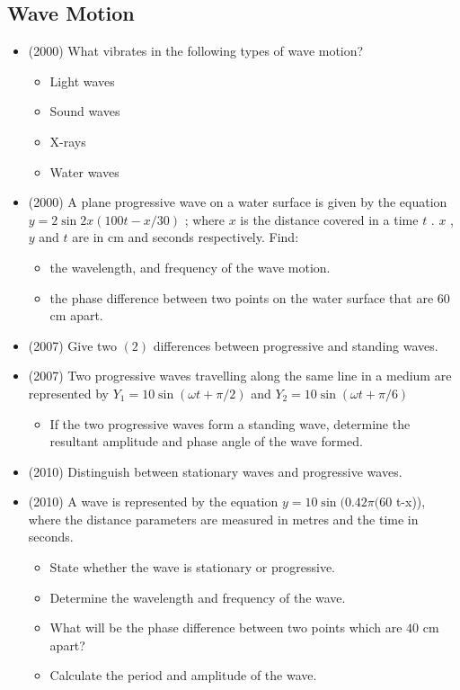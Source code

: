 \documentclass{article}
\begin{document}
\subsection{Wave Motion}
\begin{itemize}
\item (2000)  What vibrates in the following types of wave motion?
 \begin{itemize}
\item Light waves
\item Sound waves
\item X-rays
\item Water waves
\end{itemize}
\item (2000)  A plane progressive wave on a water surface is given by the equation $ y=2 \sin 2x(100t -x/30)$ ; where $ x$ is the distance covered in a time $ t$ . $ x$ , $ y$ and $ t$ are in cm and seconds respectively.  Find:
 \begin{itemize}
\item the wavelength, and frequency of the wave motion.
\item the phase difference between two points on the water surface that are $ 60$ cm apart.
\end{itemize}
\item (2007)  Give two $ (2)$ differences between progressive and standing waves.
\item (2007)  Two progressive waves travelling along the same line in a medium are represented by $ Y_{1}=10 \sin(\omega t +\pi/2)$ and $ Y_{2}=10 \sin(\omega t +\pi/6)$
 \begin{itemize}
\item If the two progressive waves form a standing wave, determine the resultant amplitude and phase angle of the wave formed.
\end{itemize}
\item (2010)  Distinguish between stationary waves and progressive waves.
\item (2010)  A wave is represented by the equation $ y=10 \sin(0.42\pi(60$ t-x)), where the distance parameters are measured in metres and the time in seconds.
 \begin{itemize}
\item State whether the wave is stationary or progressive.
\item Determine the wavelength and frequency of the wave.
\item What will be the phase difference between two points which are $ 40$ cm apart? 
\item Calculate the period and amplitude of the wave. 

\end{itemize}
\end{itemize}
\end{document}
